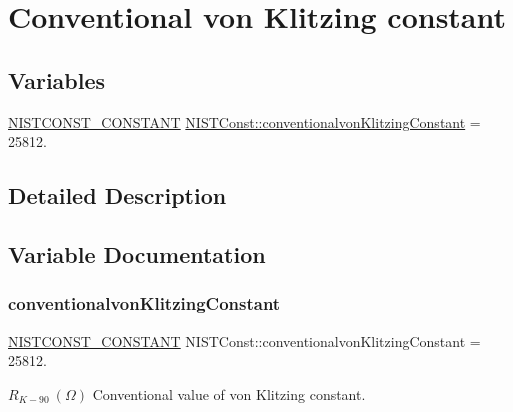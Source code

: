 \hypertarget{group___n_i_s_t_const-_conventionalvon_klitzing_constant}{}\section{Conventional von Klitzing constant}
\label{group___n_i_s_t_const-_conventionalvon_klitzing_constant}
\subsection*{Variables}
\begin{DoxyCompactItemize}
\item 
\mbox{\hyperlink{_n_i_s_t_const_8hpp_a2b0fc1d7452373f816175dd86ce26729}{N\+I\+S\+T\+C\+O\+N\+S\+T\+\_\+\+C\+O\+N\+S\+T\+A\+NT}} \mbox{\hyperlink{group___n_i_s_t_const-_conventionalvon_klitzing_constant_ga939418415f337c3a3a375d946199cfb0}{N\+I\+S\+T\+Const\+::conventionalvon\+Klitzing\+Constant}} = 25812.
\end{DoxyCompactItemize}


\subsection{Detailed Description}


\subsection{Variable Documentation}
\mbox{\label{group___n_i_s_t_const-_conventionalvon_klitzing_constant_ga939418415f337c3a3a375d946199cfb0}} 
\subsubsection{\texorpdfstring{conventionalvon\+Klitzing\+Constant}{conventionalvonKlitzingConstant}}
{\footnotesize\ttfamily \mbox{\hyperlink{_n_i_s_t_const_8hpp_a2b0fc1d7452373f816175dd86ce26729}{N\+I\+S\+T\+C\+O\+N\+S\+T\+\_\+\+C\+O\+N\+S\+T\+A\+NT}} N\+I\+S\+T\+Const\+::conventionalvon\+Klitzing\+Constant = 25812.}

$R_{K-90} \ (\Omega)$ Conventional value of von Klitzing constant. 